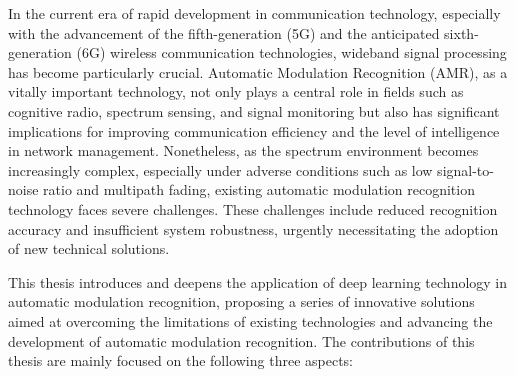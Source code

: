 \begin{ABSTRACT}
In the current era of rapid development in communication technology, especially with the advancement of the fifth-generation (5G) and the anticipated sixth-generation (6G) wireless communication technologies, wideband signal processing has become particularly crucial. Automatic Modulation Recognition (AMR), as a vitally important technology, not only plays a central role in fields such as cognitive radio, spectrum sensing, and signal monitoring but also has significant implications for improving communication efficiency and the level of intelligence in network management. Nonetheless, as the spectrum environment becomes increasingly complex, especially under adverse conditions such as low signal-to-noise ratio and multipath fading, existing automatic modulation recognition technology faces severe challenges. These challenges include reduced recognition accuracy and insufficient system robustness, urgently necessitating the adoption of new technical solutions.

This thesis introduces and deepens the application of deep learning technology in automatic modulation recognition, proposing a series of innovative solutions aimed at overcoming the limitations of existing technologies and advancing the development of automatic modulation recognition. The contributions of this thesis are mainly focused on the following three aspects:


\end{ABSTRACT}
